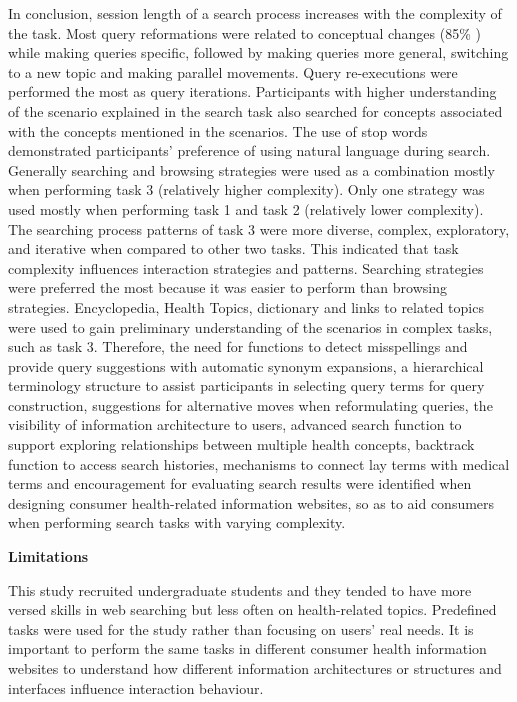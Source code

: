 \documentclass[]{article}
\begin{document}
In conclusion, session length of a search process increases with the complexity of the task. Most query reformations were related to conceptual changes (85\% ) while making queries specific,  followed by making queries more general, switching to a new topic and making parallel movements. Query re-executions were performed the most as query iterations. Participants with higher understanding of the scenario explained in the search task also searched for concepts associated with the concepts mentioned in the scenarios. The use of stop words demonstrated participants' preference of using natural language during search. Generally searching and browsing strategies were used as a combination mostly when performing task 3 (relatively higher complexity). Only one strategy was used mostly when performing task 1 and task 2 (relatively lower complexity). The searching process patterns of task 3 were more diverse, complex, exploratory, and iterative when compared to other two tasks. This indicated that task complexity influences interaction strategies and patterns. Searching strategies were preferred the most because it was easier to perform than browsing strategies. Encyclopedia, Health Topics, dictionary and links to related topics were used to gain preliminary understanding of the scenarios in complex tasks, such as task 3. Therefore, the need for functions to detect misspellings and provide query suggestions with automatic synonym expansions, a hierarchical terminology structure to assist participants in selecting query terms for query construction, suggestions for alternative moves when reformulating queries, the visibility of information architecture to users, advanced search function to support exploring relationships between multiple health concepts, backtrack function to access search histories, mechanisms to connect lay terms with medical terms and encouragement for evaluating search results were identified when designing consumer health-related information websites, so as to aid consumers when performing search tasks with varying complexity.         

\textbf{Limitations}

This study recruited undergraduate students and they tended to have more versed skills in web searching but less often on health-related topics. Predefined tasks were used for the study rather than focusing on users’ real needs. It is important to perform the same tasks in different consumer health information websites to understand how different information architectures or structures and interfaces influence interaction behaviour.
\end{document}
